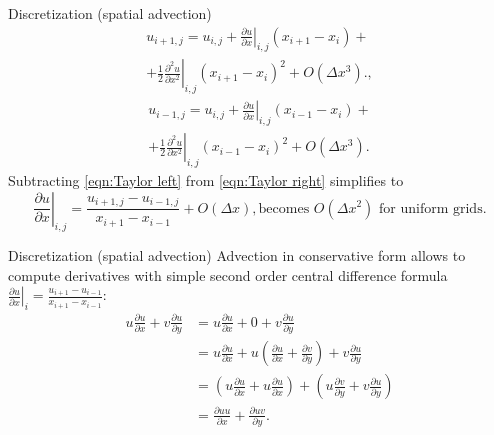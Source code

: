 \documentclass{beamer}
\begin{document}
	\begin{frame}{Discretization (spatial advection)}
	\begin{multline}\label{eqn:Taylor right} 
		u_{i+1,j}=u_{i,j}+\left.\frac{\partial u}{\partial x}\right|_{i,j}\left(x_{i+1}-x_{i}\right)+\\
		+\frac{1}{2}\left.\frac{\partial^2 u}{\partial x^2}\right|_{i,j}\left(x_{i+1}-x_{i}\right)^2+O\left(\Delta x^3\right).,
	\end{multline}
	\begin{multline}\label{eqn:Taylor left} 
		u_{i-1,j}=u_{i,j}+\left.\frac{\partial u}{\partial x}\right|_{i,j}\left(x_{i-1}-x_{i}\right)+\\
		+\frac{1}{2}\left.\frac{\partial^2 u}{\partial x^2}\right|_{i,j}\left(x_{i-1}-x_{i}\right)^2+O\left(\Delta x^3\right).
	\end{multline}
	Subtracting \eqref{eqn:Taylor left} from \eqref{eqn:Taylor right} simplifies to
	\begin{equation*}
		\left.\frac{\partial u}{\partial x}\right|_{i,j}=\frac{u_{i+1,j}-u_{i-1,j}}{x_{i+1}-x_{i-1}}+O(\Delta x), \text{becomes $O(\Delta x^2)$ for uniform grids.}
	\end{equation*}
	\end{frame}
	
	\begin{frame}{Discretization (spatial advection)}
	Advection in conservative form allows to compute derivatives with simple second order central difference formula $\left.\frac{\partial u}{\partial x}\right|_{i}=\frac{u_{i+1}-u_{i-1}}{x_{i+1}-x_{i-1}}$:
		\begin{align}\label{eqn:advection-conservative}
		u\frac{\partial u}{\partial x}+v \frac{\partial u}{\partial y}
		&=u\frac{\partial u}{\partial x}+0+v \frac{\partial u}{\partial y}\nonumber\\
		&= u\frac{\partial u}{\partial x}+ u\left(\frac{\partial u}{\partial x} +\frac{\partial v}{\partial y}\right ) +v \frac{\partial u}{\partial y}\nonumber\\
		&=\left(u\frac{\partial u}{\partial x}+ u\frac{\partial u}{\partial x}\right ) +\left(u\frac{\partial v}{\partial y} +v \frac{\partial u}{\partial y}\right )\nonumber\\
		&=\frac{\partial uu}{\partial x}+ \frac{\partial uv}{\partial y}.
	\end{align}
	
	\end{frame}
\end{document}
